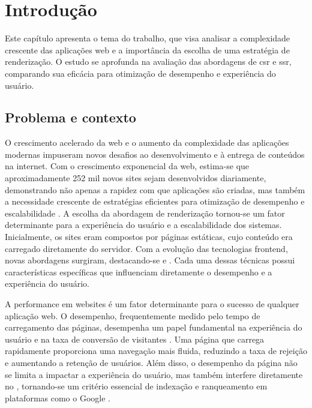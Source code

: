 \chapter{Introdução}
\label{cap:introducao}
Este capítulo apresenta o tema do trabalho, que visa analisar a complexidade crescente das aplicações web e a importância da escolha de uma estratégia de renderização. O estudo se aprofunda na avaliação das abordagens de \acrfull{csr} e \acrfull{ssr}, comparando sua eficácia para otimização de desempenho e experiência do usuário.


\section{Problema e contexto}
O crescimento acelerado da web e o aumento da complexidade das aplicações modernas impuseram novos desafios ao desenvolvimento e à entrega de conteúdos na internet. Com o crescimento exponencial da web, estima-se que aproximadamente 252 mil novos sites sejam desenvolvidos diariamente, demonstrando não apenas a rapidez com que aplicações são criadas, mas também a necessidade crescente de estratégias eficientes para otimização de desempenho e escalabilidade \cite{dataInternetUsage}. A escolha da abordagem de renderização tornou-se um fator determinante para a experiência do usuário e a escalabilidade dos sistemas. Inicialmente, os sites eram compostos por páginas estáticas, cujo conteúdo era carregado diretamente do servidor. Com a evolução das tecnologias frontend, novas abordagens surgiram, destacando-se  e . Cada uma dessas técnicas possui características específicas que influenciam diretamente o desempenho e a experiência do usuário.

A performance em websites é um fator determinante para o sucesso de qualquer aplicação web. O desempenho, frequentemente medido pelo tempo de carregamento das páginas, desempenha um papel fundamental na experiência do usuário e na taxa de conversão de visitantes \cite{webPerformance}. Uma página que carrega rapidamente proporciona uma navegação mais fluida, reduzindo a taxa de rejeição e aumentando a retenção de usuários. Além disso, o desempenho da página não se limita a impactar a experiência do usuário, mas também interfere diretamente no , tornando-se um critério essencial de indexação e ranqueamento em plataformas como o Google \cite{google}.

